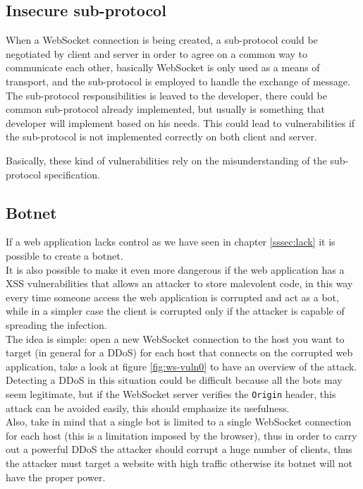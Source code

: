 	\subsection{Insecure sub-protocol}
	When a WebSocket connection is being created, a sub-protocol could be negotiated by client and server in order to agree on a common way to communicate each other, basically WebSocket is only used as a means of transport, and the sub-protocol is employed to handle the exchange of message.\newline
	The sub-protocol responsibilities is leaved to the developer, there could be common sub-protocol already implemented, but usually is something that developer will implement based on his needs.\newline
	This could lead to vulnerabilities if the sub-protocol is not implemented correctly on both client and server.\newline
	
	Basically, these kind of vulnerabilities rely on the misunderstanding of the sub-protocol specification.
	
	\subsection{Botnet}
	If a web application lacks control as we have seen in chapter \ref{sssec:lack} it is possible to create a botnet.\\
	It is also possible to make it even more dangerous if the web application has a XSS vulnerabilities that
	allows an attacker to store malevolent code, in this way every time someone access the web application
	is corrupted and act as a bot, while in a simpler case the client is corrupted only if the attacker
	is capable of spreading the infection.\\
	
	The idea is simple: open a new WebSocket connection to the host you want to target (in general for a DDoS) for
	each host that connects on the corrupted web application, take a look at figure \ref{fig:ws-vuln0} to have
	an overview of the attack.\\
	
	Detecting a DDoS in this situation could be difficult because all the bots may seem legitimate,
	but if the WebSocket server verifies the \texttt{Origin} header, this attack can be avoided easily,
	this should emphasize its usefulness.\\
	Also, take in mind that a single bot is limited to a single WebSocket connection for each host (this is a limitation imposed by the browser), thus
	in order to carry out a powerful DDoS the attacker should corrupt a huge number of clients, thus the attacker
	must target a website with high traffic otherwise its botnet will not have the proper power.\\
	
